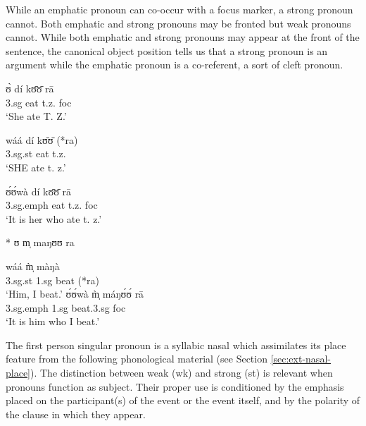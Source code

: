 \begin{exe}
\begin{exe}
\begin{exe}
{\begin{exe}
\begin{exe}
\begin{exe}
\begin{exe}
\begin{exe}
\begin{exe}
\begin{exe}
\begin{xlist}
While an emphatic pronoun can co-occur with a focus marker,  a strong pronoun 
cannot. Both emphatic and strong pronouns may be fronted but weak pronouns 
cannot. While both emphatic and strong pronouns may appear  at the front of the 
sentence, the canonical object position tells us that a strong pronoun is an 
argument while the   emphatic pronoun is a  co-referent, a sort of cleft 
pronoun. 
 
 




  \ea\label{ex:GRM-pro-WSE}
   
 \begin{multicols}{2}
  

   \ea\label{ex:GRM-pro-W}
\gll ʊ̀ dí kʊ̄ʊ̄ rā\\
     {\sc 3.sg} eat t.z. {\sc foc} \\
\glt  `She ate T. Z.' 
   
   \ex\label{ex:GRM-pro-S}
   \gll wáá dí kʊ̄ʊ̄ (*ra)\\
     {\sc 3.sg.st} eat t.z. \\
\glt  `SHE ate t. z.' 
   
 \ex\label{ex:GRM-pro-E}  
      \gll ʊ́ʊ́wà dí kʊ̄ʊ̄ rā\\
     {\sc 3.sg.emph} eat t.z.  {\sc foc} \\
\glt  `It is her who ate t. z.' 

 \ex\label{ex:GRM-pro-W-cleft}  
    * ʊ m̩ maŋʊʊ ra
     
     \ex\label{ex:GRM-pro-S-cleft}  
      \gll  wáá  m̩̀ màŋà\\
  {\sc 3.sg.st} {\sc 1.sg}  beat (*ra) \\
 \glt   `Him, I beat.'
  \ex\label{ex:GRM-pro-E-cleft}  
      \gll  ʊ́ʊ́wà  m̩̀ máŋʊ́ʊ́ rā\\
        {\sc 3.sg.emph}  {\sc 1.sg}  beat.{\sc 3.sg}   {\sc foc} \\
 \glt   `It is him who I beat.'

  \z
  
   \end{multicols}
  \z
  
  
  The first person singular pronoun is a syllabic nasal which assimilates its 
place feature from the following phonological material (see Section 
\ref{sec:ext-nasal-place}). The  distinction between weak ({\sc wk}) and strong 
({\sc st})  is relevant when pronouns function as subject. Their proper use is 
conditioned by the emphasis  placed on the participant(s) of the event or the 
event itself, and by the polarity of the clause in which they appear.  






\end{xlist}
\end{exe}
\end{exe}
\end{exe}
\end{exe}
\end{exe}
\end{exe}
\end{exe}}
\end{exe}
\end{exe}
\end{exe}

